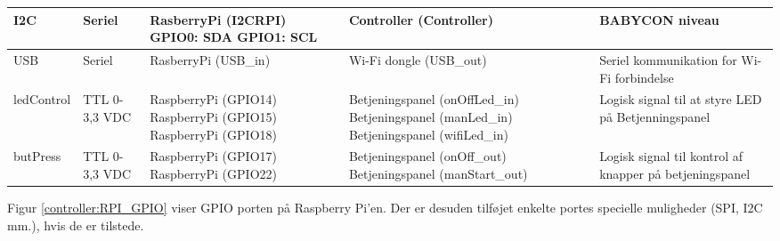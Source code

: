 \begin{center}
\begin{longtable}{|p{}|p{}|p{}|p{}|p{3cm}|}
I2C			
&Seriel		
&RasberryPi \newline (I2CRPI) \newline	
	GPIO0: SDA \newline	
	GPIO1: SCL \newline	
&Controller \newline (Controller) 			
&BABYCON niveau
\\\hline

USB		
&Seriel				
&RasberryPi \newline (USB\_in) 			
&Wi-Fi dongle \newline (USB\_out) \newline	
&Seriel kommunikation for Wi-Fi forbindelse
\\\hline

ledControl
&TTL 0-3,3 VDC		
&RaspberryPi \newline (GPIO14) \newline
 RaspberryPi \newline (GPIO15) \newline
 RaspberryPi \newline (GPIO18)
&Betjeningspanel \newline (onOffLed\_in) \newline
 Betjeningspanel \newline (manLed\_in) \newline
 Betjeningspanel \newline (wifiLed\_in)
&Logisk signal til at styre LED på Betjenningspanel
\\\hline

butPress
&TTL 0-3,3 VDC		
&RaspberryPi \newline (GPIO17) \newline
 RaspberryPi \newline (GPIO22)
&Betjeningspanel \newline (onOff\_out) \newline
 Betjeningspanel \newline (manStart\_out)
&Logisk signal til kontrol af knapper på betjeningspanel
\\\hline

\end{longtable}
\end{center}

Figur \ref{controller:RPI_GPIO} viser GPIO porten på Raspberry Pi'en. Der er desuden tilføjet enkelte portes specielle muligheder (SPI, I2C mm.), hvis de er tilstede. 



